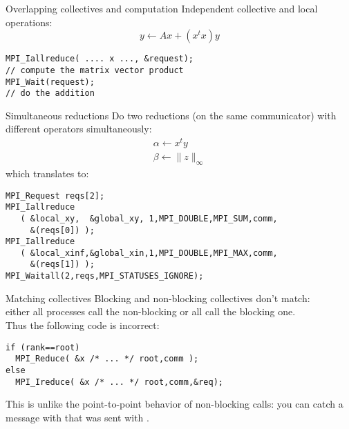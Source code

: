 \begin{numberedframe}{Overlapping collectives and computation}
  \label{sl:coll-nonblock-overlap}
  Independent collective and local operations:
\[ y \leftarrow Ax + (x^tx)y \]
\begin{lstlisting}
MPI_Iallreduce( .... x ..., &request);
// compute the matrix vector product
MPI_Wait(request);
// do the addition
\end{lstlisting}
\end{numberedframe}

\begin{numberedframe}{Simultaneous reductions}
  \label{sl:coll-nonblock-simult}
  Do two reductions (on the same communicator) with different
  operators simultaneously:
  \[ 
  \begin{array}{l}
    \alpha\leftarrow x^ty\\
    \beta\leftarrow \|z\|_\infty
  \end{array}
  \]
which translates to:
\begin{lstlisting}
MPI_Request reqs[2];
MPI_Iallreduce
   ( &local_xy,  &global_xy, 1,MPI_DOUBLE,MPI_SUM,comm,
     &(reqs[0]) );
MPI_Iallreduce
   ( &local_xinf,&global_xin,1,MPI_DOUBLE,MPI_MAX,comm,
     &(reqs[1]) );
MPI_Waitall(2,reqs,MPI_STATUSES_IGNORE);
\end{lstlisting}
\end{numberedframe}



\begin{numberedframe}{Matching collectives}
  \label{sl:coll-nonblock-match}
  Blocking and non-blocking collectives don't match:\\
  either all processes
  call the non-blocking or all call the blocking one.\\
  Thus the following code is incorrect:
\begin{lstlisting}
if (rank==root)
  MPI_Reduce( &x /* ... */ root,comm );
else
  MPI_Ireduce( &x /* ... */ root,comm,&req);
\end{lstlisting}
  This is unlike the point-to-point behavior of non-blocking calls:
  you can catch a message with 
  that was sent with .
\end{numberedframe}

